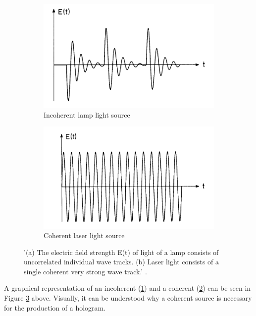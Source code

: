 \documentclass[12pt]{article}
\begin{document}
\begin{figure}[H]
    \centering
    \begin{subfigure}[b]{.45\textwidth}
        \centering
        \includegraphics[width=\linewidth]{incoherent source.png}
        \caption{\centering Incoherent lamp light source}
        \label{fig:5a}
    \end{subfigure}
    \hfill
    \begin{subfigure}[b]{.45\textwidth}
        \centering
        \includegraphics[width=\linewidth]{coherent source.png}
        \caption{\centering Coherent laser light source}
        \label{fig:5b}
    \end{subfigure}
    \caption{\centering '(a) The electric field strength E(t) of light of a lamp consists of uncorrelated individual wave tracks.
    (b) Laser light consists of a single coherent very strong wave track.' \protect\cite{haken1986laser}.}
    \label{fig:5}
\end{figure}

A graphical representation of an incoherent (\ref{fig:5a}) and a coherent (\ref{fig:5b}) can be seen in Figure \ref{fig:5} above. Visually, it can be understood why a coherent
source is necessary for the production of a hologram.
\end{document}
